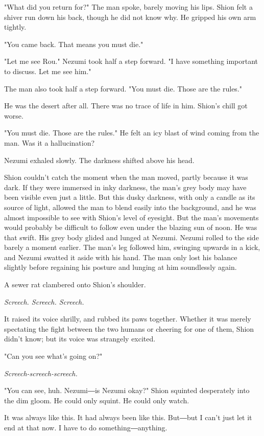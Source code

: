 "What did you return for?" The man spoke, barely moving his lips. Shion
felt a shiver run down his back, though he did not know why. He gripped
his own arm tightly.

"You came back. That means you must die."

"Let me see Rou." Nezumi took half a step forward. "I have something
important to discuss. Let me see him."

The man also took half a step forward. "You must die. Those are the
rules."

He was the desert after all. There was no trace of life in him. Shion's
chill got worse.

"You must die. Those are the rules." He felt an icy blast of wind coming
from the man. Was it a hallucination?

Nezumi exhaled slowly. The darkness shifted above his head.

Shion couldn't catch the moment when the man moved, partly because it
was dark. If they were immersed in inky darkness, the man's grey body
may have been visible even just a little. But this dusky darkness, with
only a candle as its source of light, allowed the man to blend easily
into the background, and he was almost impossible to see with Shion's
level of eyesight. But the man's movements would probably be difficult
to follow even under the blazing sun of noon. He was that swift. His
grey body glided and lunged at Nezumi. Nezumi rolled to the side barely
a moment earlier. The man's leg followed him, swinging upwards in a
kick, and Nezumi swatted it aside with his hand. The man only lost his
balance slightly before regaining his posture and lunging at him
soundlessly again.

A sewer rat clambered onto Shion's shoulder.

\emph{Screech. Screech. Screech.}

It raised its voice shrilly, and rubbed its paws together. Whether it
was merely spectating the fight between the two humans or cheering for
one of them, Shion didn't know; but its voice was strangely excited.

"Can you see what's going on?"

\emph{Screech-screech-screech.}

"You can see, huh. Nezumi―is Nezumi okay?" Shion squinted desperately
into the dim gloom. He could only squint. He could only watch.

It was always like this. It had always been like this. But―but I can't
just let it end at that now. I have to do something―anything.

